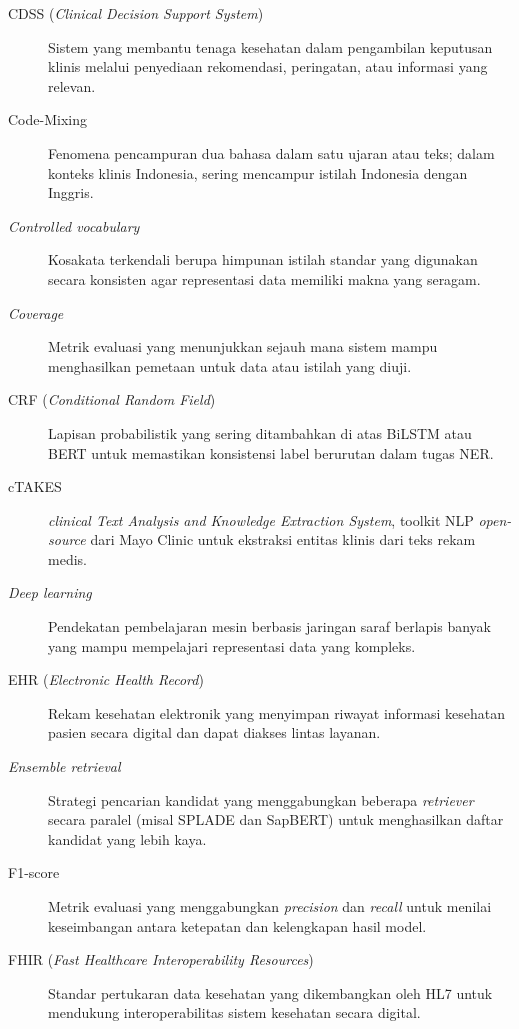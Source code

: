 {\begin{description}
    \item[CDSS (\textit{Clinical Decision Support System})] Sistem yang membantu tenaga kesehatan dalam pengambilan keputusan klinis melalui penyediaan rekomendasi, peringatan, atau informasi yang relevan.

    \item[Code-Mixing] Fenomena pencampuran dua bahasa dalam satu ujaran atau teks; dalam konteks klinis Indonesia, sering mencampur istilah Indonesia dengan Inggris.

    \item[\textit{Controlled vocabulary}] Kosakata terkendali berupa himpunan istilah standar yang digunakan secara konsisten agar representasi data memiliki makna yang seragam.

    \item[\textit{Coverage}] Metrik evaluasi yang menunjukkan sejauh mana sistem mampu menghasilkan pemetaan untuk data atau istilah yang diuji.

    \item[CRF (\textit{Conditional Random Field})] Lapisan probabilistik yang sering ditambahkan di atas BiLSTM atau BERT untuk memastikan konsistensi label berurutan dalam tugas NER.

    \item[cTAKES] \textit{clinical Text Analysis and Knowledge Extraction System}, toolkit NLP \textit{open-source} dari Mayo Clinic untuk ekstraksi entitas klinis dari teks rekam medis.

    \item[\textit{Deep learning}] Pendekatan pembelajaran mesin berbasis jaringan saraf berlapis banyak yang mampu mempelajari representasi data yang kompleks.

    \item[EHR (\textit{Electronic Health Record})] Rekam kesehatan elektronik yang menyimpan riwayat informasi kesehatan pasien secara digital dan dapat diakses lintas layanan.

    \item[\textit{Ensemble retrieval}] Strategi pencarian kandidat yang menggabungkan beberapa \textit{retriever} secara paralel (misal SPLADE dan SapBERT) untuk menghasilkan daftar kandidat yang lebih kaya.

    \item[F1-score] Metrik evaluasi yang menggabungkan \textit{precision} dan \textit{recall} untuk menilai keseimbangan antara ketepatan dan kelengkapan hasil model.

    \item[FHIR (\textit{Fast Healthcare Interoperability Resources})] Standar pertukaran data kesehatan yang dikembangkan oleh HL7 untuk mendukung interoperabilitas sistem kesehatan secara digital.


\end{description}}
